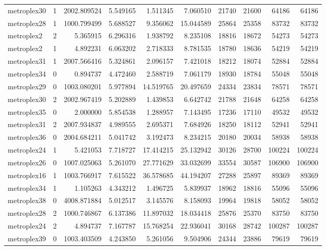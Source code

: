 \begin{longtable}{|l|r|r|r|r|r|r|r|r|r|}
metroplex30 & 1 & 2002.809524 & 5.549165 & 1.511345 & 7.060510 & 21740 & 21600 & 64186 & 64186 \\
metroplex28 & 1 & 1000.799499 & 5.688527 & 9.356062 & 15.044589 & 25864 & 25358 & 83732 & 83732 \\
metroplex2 & 2 & 5.365915 & 6.296316 & 1.938792 & 8.235108 & 18816 & 18672 & 54273 & 54273 \\
metroplex2 & 1 & 4.892231 & 6.063202 & 2.718333 & 8.781535 & 18780 & 18636 & 54219 & 54219 \\
metroplex31 & 1 & 2007.566416 & 5.324861 & 2.096157 & 7.421018 & 18212 & 18074 & 52884 & 52884 \\
metroplex34 & 0 & 0.894737 & 4.472460 & 2.588719 & 7.061179 & 18930 & 18784 & 55048 & 55048 \\
metroplex29 & 0 & 1003.080201 & 5.977894 & 14.519765 & 20.497659 & 24334 & 23834 & 78571 & 78571 \\
metroplex30 & 2 & 2002.967419 & 5.202889 & 1.439853 & 6.642742 & 21788 & 21648 & 64258 & 64258 \\
metroplex35 & 0 & 2.000000 & 5.854538 & 1.288957 & 7.143495 & 17236 & 17110 & 49532 & 49532 \\
metroplex31 & 2 & 2007.934837 & 4.989555 & 2.695371 & 7.684926 & 18250 & 18112 & 52941 & 52941 \\
metroplex36 & 0 & 2004.684211 & 5.041742 & 3.192473 & 8.234215 & 20180 & 20034 & 58938 & 58938 \\
metroplex24 & 1 & 5.421053 & 7.718727 & 17.414215 & 25.132942 & 30126 & 28700 & 100224 & 100224 \\
metroplex26 & 0 & 1007.025063 & 5.261070 & 27.771629 & 33.032699 & 33554 & 30587 & 106900 & 106900 \\
metroplex16 & 1 & 1003.766917 & 7.615522 & 36.578685 & 44.194207 & 27288 & 25897 & 89369 & 89369 \\
metroplex34 & 1 & 1.105263 & 4.343212 & 1.496725 & 5.839937 & 18962 & 18816 & 55096 & 55096 \\
metroplex38 & 0 & 4008.871884 & 5.012517 & 3.145576 & 8.158093 & 19964 & 19818 & 58052 & 58052 \\
metroplex28 & 2 & 1000.746867 & 6.137386 & 11.897032 & 18.034418 & 25876 & 25370 & 83750 & 83750 \\
metroplex24 & 2 & 4.894737 & 7.167787 & 15.768254 & 22.936041 & 30168 & 28742 & 100287 & 100287 \\
metroplex39 & 0 & 1003.403509 & 4.243850 & 5.261056 & 9.504906 & 24344 & 23886 & 79619 & 79619 \\

\end{longtable}
